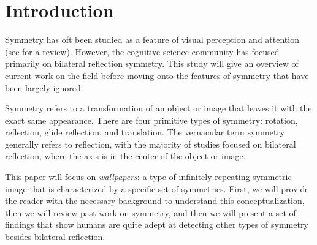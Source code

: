 \section{Introduction}
Symmetry has oft been studied as a feature of visual perception and attention (see \citet{review} for a review). However,  the cognitive science community has focused primarily on bilateral reflection symmetry. This study will give an overview of current work on the field before moving onto the features of symmetry that have been largely ignored. 

Symmetry refers to a transformation of an object or image that leaves it with the exact same appearance. There are four primitive types of symmetry: rotation, reflection, glide reflection, and translation. The vernacular term symmetry generally refers to reflection, with the majority of studies focused on bilateral reflection, where the axis is in the center of the object or image.

This paper will focus on \textit{wallpapers}: a type of infinitely repeating symmetric image that is characterized by a specific set of symmetries. First, we will provide the reader with the necessary background to understand this conceptualization, then we will review past work on symmetry, and then we will present a set of findings that show humans are quite adept at detecting other types of symmetry besides bilateral reflection.



